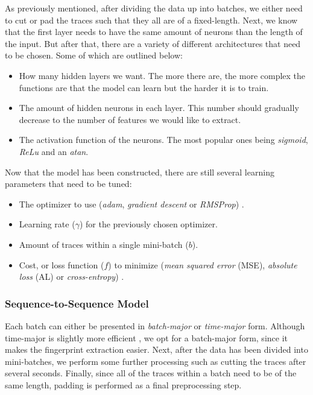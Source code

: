 As previously mentioned, after dividing the data up into batches, we either need to cut or pad the traces such that they all are of a fixed-length.
Next, we know that the first layer needs to have the same amount of neurons than the length of the input.
But after that, there are a variety of different architectures that need to be chosen.
Some of which are outlined below:

\newpage

\begin{itemize}
  \item How many hidden layers we want.
    The more there are, the more complex the functions are that the model can learn but the harder it is to train.

  \item The amount of hidden neurons in each layer.
    This number should gradually decrease to the number of features we would like to extract.

  \item The activation function of the neurons.
    The most popular ones being \textit{sigmoid}, \textit{ReLu} and an \textit{atan}.
\end{itemize}

Now that the model has been constructed, there are still several learning parameters that need to be tuned:

\begin{itemize}
    \item The optimizer to use (\textit{adam}, \textit{gradient descent} or \textit{RMSProp}) \cite{tensorflow}.
    \item Learning rate ($\gamma$) for the previously chosen optimizer.
    \item Amount of traces within a single mini-batch ($b$).
    \item Cost, or loss function ($f$) to minimize (\textit{mean squared error} (MSE), \textit{absolute loss} (AL) or \textit{cross-entropy}) \cite{tensorflow}.
\end{itemize}

\subsubsection{Sequence-to-Sequence Model}

Each batch can either be presented in \textit{batch-major} or \textit{time-major} form.
Although time-major is slightly more efficient \cite{tensorflow}, we opt for a batch-major form, since it makes the fingerprint extraction easier.
Next, after the data has been divided into mini-batches, we perform some further processing such as cutting the traces after several seconds.
Finally, since all of the traces within a batch need to be of the same length, padding is performed as a final preprocessing step.

